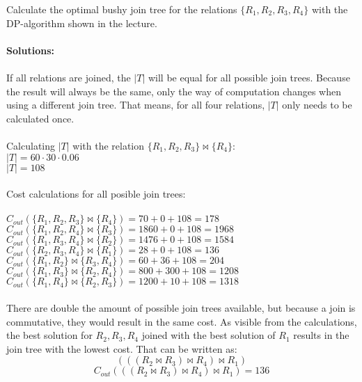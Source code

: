 \begin{enumerate}
        Calculate the optimal bushy join tree for the relations $\{R_1, R_2, R_3, R_4\}$ with the DP-algorithm shown in the lecture.\\\\
        {\bf Solutions:}\\\\
        If all relations are joined, the $|T|$ will be equal for all possible join trees. Because the result will always be the same, only the way of computation changes when using a different join tree. That means, for all four relations, $|T|$ only needs to be calculated once.\\\\
        Calculating $|T|$ with the relation $\{R_1,R_2,R_3\} \Join \{R_4\}$:\\
        $|T| = 60 \cdot 30 \cdot 0.06$\\
        $|T| = 108$\\\\
        Cost calculations for all posible join trees:\\\\
        $C_{out} (\{R_1,R_2,R_3\} \Join \{R_4\}) = 70 + 0 + 108 = 178$\\
        $C_{out} (\{R_1,R_2,R_4\} \Join \{R_3\}) = 1860 + 0 + 108 = 1968$\\
        $C_{out} (\{R_1,R_3,R_4\} \Join \{R_2\}) = 1476 + 0 + 108 = 1584$\\
        $C_{out} (\{R_2,R_3,R_4\} \Join \{R_1\}) = 28 + 0 + 108 = 136$\\
        $C_{out} (\{R_1,R_2\} \Join \{R_3,R_4\}) = 60 + 36 + 108 = 204$\\
        $C_{out} (\{R_1,R_3\} \Join \{R_2,R_4\}) = 800 + 300 + 108 = 1208$\\
        $C_{out} (\{R_1,R_4\} \Join \{R_2,R_3\}) = 1200 + 10 + 108 = 1318$\\\\
        There are double the amount of possible join trees available, but because a join is commutative, they would result in the same cost. As visible from the calculations, the best solution for ${R_2, R_3, R_4}$ joined with the best solution of ${R_1}$ results in the join tree with the lowest cost. That can be written as:\\
        \[ (((R_2 \Join R_3) \Join R_4) \Join R_1)\] 
        \[C_{out} (((R_2 \Join R_3) \Join R_4) \Join R_1) = 136\]
        


\end{enumerate}
\newpage

